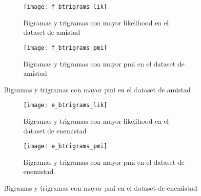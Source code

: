 \documentclass{pre-tfg}
\begin{document}
\begin{figure}
	\centering
	\begin{subfigure}{\textwidth}
		\texttt{[image: f\_btrigrams\_lik]}
		\caption{Bigramas y trigramas con mayor likelihood en el dataset de amistad}
		\label{fig:f_btrigram_lik}
		
	\end{subfigure}
	\begin{subfigure}{\textwidth}
		\texttt{[image: f\_btrigrams\_pmi]}
		\caption{Bigramas y trigramas con mayor pmi en el dataset de amistad}
		\label{fig:f_btrigram_pmi}
	\end{subfigure}
	
	
\end{figure}

\begin{figure}
	\centering
	\begin{subfigure}{\textwidth}
		\texttt{[image: e\_btrigrams\_lik]}
		\caption{Bigramas y trigramas con mayor likelihood en el dataset de enemistad}
		\label{fig:e_btrigram_lik}
		
	\end{subfigure}
	\begin{subfigure}{\textwidth}
		\texttt{[image: e\_btrigrams\_pmi]}
		\caption{Bigramas y trigramas con mayor pmi en el dataset de enemistad}
		\label{fig:e_btrigram_pmi}
	\end{subfigure}
	
	
\end{figure}



\end{document}
